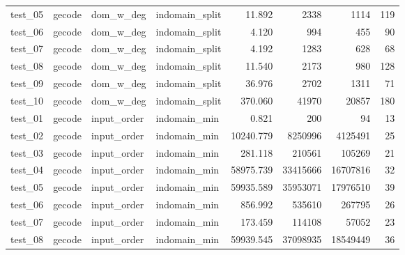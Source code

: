 \begin{longtable}{l l l l r r r r}
    test\_05         & gecode          & dom\_w\_deg       & indomain\_split   & 11.892             & 2338           & 1114              & 119            \\
    test\_06         & gecode          & dom\_w\_deg       & indomain\_split   & 4.120              & 994            & 455               & 90             \\
    test\_07         & gecode          & dom\_w\_deg       & indomain\_split   & 4.192              & 1283           & 628               & 68             \\
    test\_08         & gecode          & dom\_w\_deg       & indomain\_split   & 11.540             & 2173           & 980               & 128            \\
    test\_09         & gecode          & dom\_w\_deg       & indomain\_split   & 36.976             & 2702           & 1311              & 71             \\
    test\_10         & gecode          & dom\_w\_deg       & indomain\_split   & 370.060            & 41970          & 20857             & 180            \\
    \midrule
    test\_01         & gecode          & input\_order      & indomain\_min     & 0.821              & 200            & 94                & 13             \\
    test\_02         & gecode          & input\_order      & indomain\_min     & 10240.779          & 8250996        & 4125491           & 25             \\
    test\_03         & gecode          & input\_order      & indomain\_min     & 281.118            & 210561         & 105269            & 21             \\
    test\_04         & gecode          & input\_order      & indomain\_min     & 58975.739          & 33415666       & 16707816          & 32             \\
    test\_05         & gecode          & input\_order      & indomain\_min     & 59935.589          & 35953071       & 17976510          & 39             \\
    test\_06         & gecode          & input\_order      & indomain\_min     & 856.992            & 535610         & 267795            & 26             \\
    test\_07         & gecode          & input\_order      & indomain\_min     & 173.459            & 114108         & 57052             & 23             \\
    test\_08         & gecode          & input\_order      & indomain\_min     & 59939.545          & 37098935       & 18549449          & 36             \\

\end{longtable}
